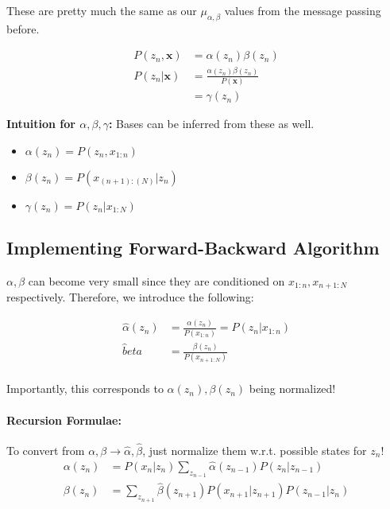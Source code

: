 \documentclass[a4paper,12pt]{report}
\begin{document}
These are pretty much the same as our $\mu_{\alpha,\beta}$ values from the message passing before.

\begin{equation}
\begin{split}
P(z_n, \pmb x) &= \alpha(z_n) \beta(z_n) \\
P(z_n | \pmb x) &= \frac{\alpha(z_n)\beta(z_n)}{P(\pmb x)} \\
&= \gamma(z_n)
\end{split}
\end{equation}

\textbf{Intuition for $\alpha, \beta, \gamma$:} Bases can be inferred from these as well.
\begin{itemize}
\item $\alpha(z_n) = P(z_n, x_{1:n})$
\item $\beta(z_n) = P( x_{(n+1):(N)} | z_n)$
\item $\gamma (z_n) = P(z_n | x_{1:N})$
\end{itemize}


\subsection{Implementing Forward-Backward Algorithm}

$\alpha, \beta$ can become very small since they are conditioned on $x_{1:n}, x_{n+1:N}$ respectively. Therefore, we introduce the following:

\begin{equation}
\begin{split}
\hat \alpha(z_n) &= \frac{\alpha(z_n)}{P(x_{1:n})} = P(z_n | x_{1:n}) \\
\hat beta &= \frac{\beta(z_n)}{P(x_{n+1:N})} \\
\end{split}
\end{equation}

Importantly, this corresponds to $\alpha(z_n), \beta(z_n)$ being normalized!

\paragraph{Recursion Formulae: } To convert from $\alpha, \beta \to \hat\alpha, \hat\beta$, just normalize them w.r.t. possible states for $z_n$!
\begin{equation}
\begin{split}
\alpha(z_n) &= P(x_n | z_n) \sum_{z_{n-1}}^{} \hat\alpha(z_{n-1}) P(z_n | z_{n-1}) \\
\beta(z_n) &= \sum_{z_{n+1}}^{} \hat\beta(z_{n+1}) P(x_{n+1} | z_{n+1}) P(z_{n-1} | z_n) \\
\end{split}
\end{equation}
\end{document}
